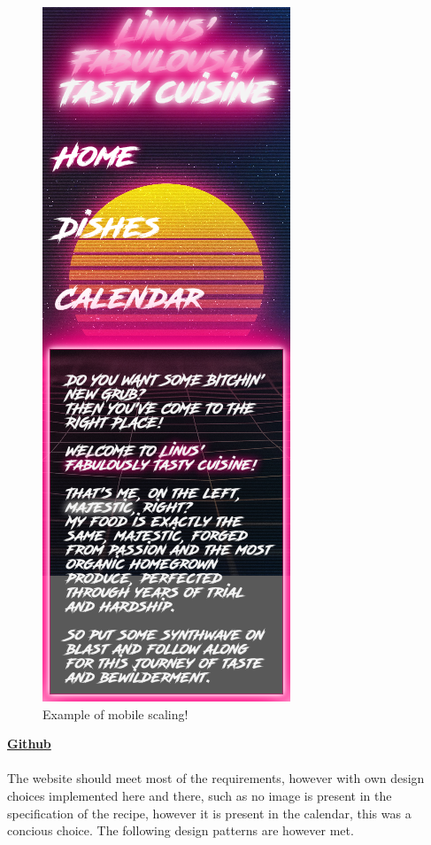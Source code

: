 \documentclass[a4paper]{scrartcl}
\begin{document}
\begin{figure}[H]
  \begin{center}
    \includegraphics[scale=0.35]{images/Scr1.png}
    \caption{Example of mobile scaling!}
    \label{fig:recipe}
  \end{center}
\end{figure}
\newpage
\newpage
\noindent
\textbf{\href{https://github.com/linus-dev/KTH-Projects/tree/master/ID1354/1}{Github}}\\\\
The website should meet most of the requirements, however with own design choices implemented here and
there, such as no image is present in the specification of the recipe, however it is present in the
calendar, this was a concious choice. The following design patterns are however met.
\end{document}
